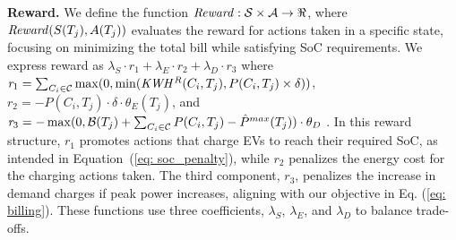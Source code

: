 {\bf Reward.} We define the function ${\it Reward}: \mathcal{S} \times \mathcal{A} \rightarrow \Re$, where ${\it Reward}(S(T_j), A(T_j))$ evaluates the reward for actions taken in a specific state, focusing on minimizing the total bill while satisfying SoC requirements. We express reward as $\lambda_{S} \cdot \mathit{r}_1 + \lambda_{E} \cdot \mathit{r}_2 + \lambda_{D} \cdot \mathit{r}_3$ where $\mathit{r}_1 =  \sum_{C_i\in\mathcal{C}} \max(0, \min({\it KWH^{R}}(C_i, T_j), P(C_i, T_j) \times \delta))$, $\mathit{r}_2 = - P(C_i, T_j) \cdot \delta  \cdot \theta_E(T_j)$, and $\mathit{r}_3 = - \max(0, \mathcal{B}(T_j) + \sum_{C_i \in \mathcal{C}} P(C_i, T_j) - \hat{P}^{max}(T_j)) \cdot \theta_D$
.
In this reward structure, $\mathit{r}_1$ promotes actions that charge EVs to reach their required SoC, as intended in Equation~(\ref{eq: soc_penalty}), while $\mathit{r}_2$ penalizes the energy cost for the charging actions taken. The third component, $\mathit{r}_3$, penalizes the increase in demand charges if peak power increases, aligning with our objective in Eq. (\ref{eq: billing}). These functions use three  coefficients, $\lambda_{S}$, $\lambda_{E}$, and $\lambda_{D}$ to balance trade-offs.







